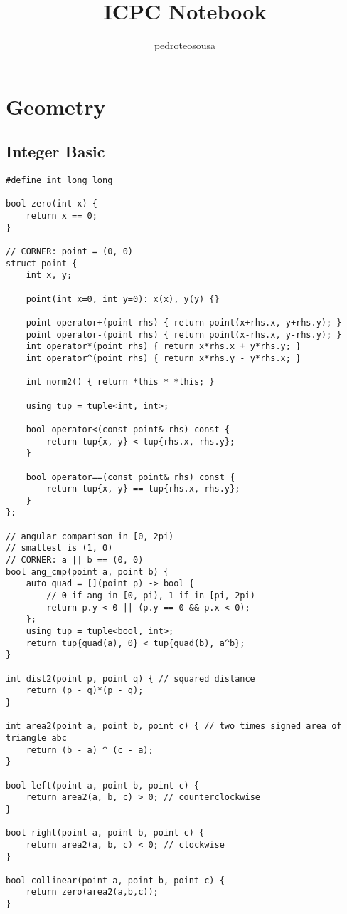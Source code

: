 \documentclass{article}
\title{ICPC Notebook}
\author{pedroteosousa}
\date{}
\begin{document}
\maketitle
\tableofcontents

\section{Geometry}
\subsection{Integer Basic}
\begin{verbatim}
#define int long long

bool zero(int x) {
	return x == 0;
}

// CORNER: point = (0, 0)
struct point {
	int x, y;
	
	point(int x=0, int y=0): x(x), y(y) {}
	
	point operator+(point rhs) { return point(x+rhs.x, y+rhs.y); }
	point operator-(point rhs) { return point(x-rhs.x, y-rhs.y); }
	int operator*(point rhs) { return x*rhs.x + y*rhs.y; }
	int operator^(point rhs) { return x*rhs.y - y*rhs.x; }

	int norm2() { return *this * *this; }

	using tup = tuple<int, int>;

	bool operator<(const point& rhs) const {
		return tup{x, y} < tup{rhs.x, rhs.y};
	}
	
	bool operator==(const point& rhs) const {
		return tup{x, y} == tup{rhs.x, rhs.y};
	}
};

// angular comparison in [0, 2pi)
// smallest is (1, 0)
// CORNER: a || b == (0, 0)
bool ang_cmp(point a, point b) {
	auto quad = [](point p) -> bool {
		// 0 if ang in [0, pi), 1 if in [pi, 2pi)
		return p.y < 0 || (p.y == 0 && p.x < 0);
	};
	using tup = tuple<bool, int>;
	return tup{quad(a), 0} < tup{quad(b), a^b};
}

int dist2(point p, point q) { // squared distance
    return (p - q)*(p - q);
}

int area2(point a, point b, point c) { // two times signed area of triangle abc
	return (b - a) ^ (c - a);
}

bool left(point a, point b, point c) {
	return area2(a, b, c) > 0; // counterclockwise
}

bool right(point a, point b, point c) {
	return area2(a, b, c) < 0; // clockwise
}

bool collinear(point a, point b, point c) {
	return zero(area2(a,b,c));
}


\end{verbatim}
\end{document}

